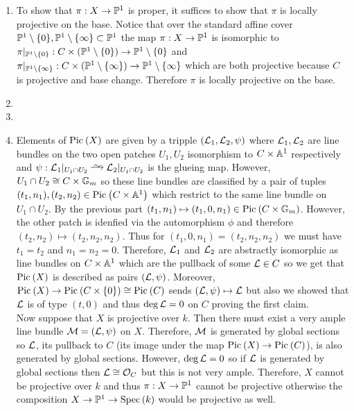 \documentclass[12pt]{article}
\begin{document}
\begin{enumerate}
\item To show that $\pi : X \to \P^1$ is proper, it suffices to show that $\pi$ is locally projective on the base. Notice that over the standard affine cover $\P^1 \setminus \{ 0 \}, \P^1 \setminus \{ \infty \} \subset \P^1$ the map $\pi : X \to \P^1$ is isomorphic to $\pi|_{\P^1 \setminus \{ 0 \}} : C \times (\P^1 \setminus \{ 0 \}) \to \P^1 \setminus \{ 0 \}$ and $\pi|_{\P^1 \setminus \{ \infty \}} : C \times (\P^1 \setminus \{ \infty \}) \to \P^1 \setminus \{ \infty \}$ which are both projective because $C$ is projective and base change. Therefore $\pi$ is locally projective on the base. 

\item 

\item 

\item Elements of $\Pic{X}$ are given by a tripple $(\L_1, \L_2, \psi)$ where $\L_1, \L_2$ are line bundles on the two open patches $U_1, U_2$ isomorphism to $C \times \A^1$ respectively and $\psi : \L_1|_{U_1 \cap U_2} \iso \L_2|_{U_1 \cap U_2}$ is the glueing map. However, $U_1 \cap U_2 \cong C \times \Gm$ so these line bundles are classified by a pair of tuples $(t_1, n_1), (t_2, n_2) \in \Pic{C \times \A^1}$ which restrict to the same line bundle on $U_1 \cap U_2$. By the previous part $(t_1, n_1) \mapsto (t_1, 0, n_1) \in \Pic{C \times \Gm}$. However, the other patch is idenfied via the automorphism $\phi$ and therefore $(t_2, n_2) \mapsto (t_2, n_2, n_2)$. Thus for $(t_1, 0, n_1) = (t_2, n_2, n_2)$ we must have $t_1 = t_2$ and $n_1 = n_2 = 0$. Therefore, $\L_1$ and $\L_2$ are abstractly isomorphic as line bundles on $C \times \A^1$ which are the pullback of some $\L \in C$ so we get that $\Pic{X}$ is described as pairs $(\L, \psi)$. Moreover, $\Pic{X} \to \Pic{C \times \{ 0 \}} \cong \Pic{C}$ sends $(\L, \psi) \mapsto \L$ but also we showed that $\L$ is of type $(t, 0)$ and thus $\deg{\L} = 0$ on $C$ proving the first claim.
\bigskip\\
Now suppose that $X$ is projective over $k$. Then there must exist a very ample line bundle $\M = (\L, \psi)$ on $X$. Therefore, $\M$ is generated by global sections so $\L$, its pullback to $C$ (its image under the map $\Pic{X} \to \Pic{C}$), is also generated by global sections. However, $\deg{\L} = 0$ so if $\L$ is generated by global sections then $\L \cong \struct{C}$ but this is not very ample. Therefore, $X$ cannot be projective over $k$ and thus $\pi : X \to \P^1$ cannot be projective otherwise the composition $X \to \P^1 \to \Spec{k}$ would be projective as well. 
\end{enumerate}
\end{document}
